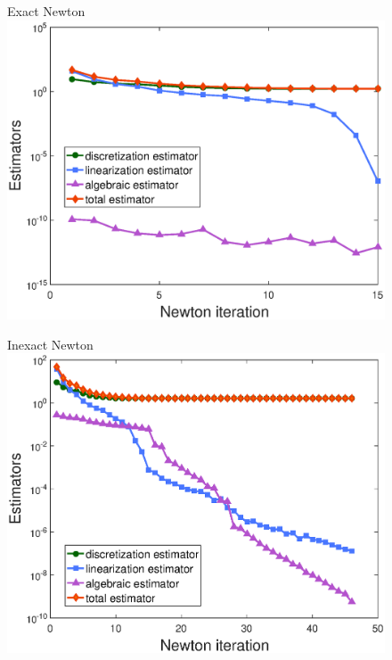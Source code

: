 \documentclass[10 pt]{beamer}
\begin{document}
\begin{frame}
\vspace{-0.3 cm}
\begin{figure}
   \begin{minipage}[c]{.33\linewidth}
   \centering
   Exact  Newton 
\includegraphics[width=\textwidth]{fig_article/estimators_newton_step_exact_resolution_modif_2.eps}    
   \end{minipage} \hfill
   \begin{minipage}[c]{.33\linewidth}
   \centering
   Inexact Newton
\includegraphics[width=\textwidth]{fig_article/estimators_newton_step_inexact_resolution_modif_2.eps}     
   \end{minipage} \hfill

\end{figure}
\end{frame}
\end{document}
